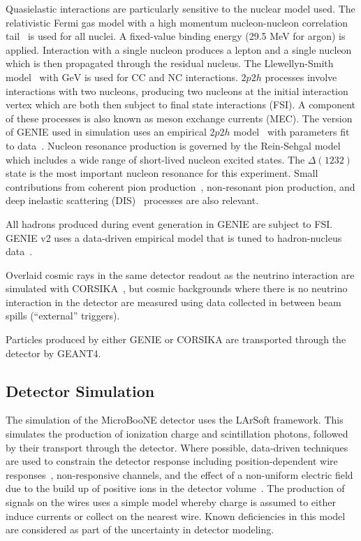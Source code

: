 \documentclass[%
twocolumn,
 amsmath,amssymb,
 aps,
prd,
superscriptaddress,showpacs]{revtex4-2}
\begin{document}
Quasielastic interactions are particularly sensitive to the nuclear model used.  The relativistic Fermi gas model with a high momentum nucleon-nucleon correlation tail~\cite{Bodek:1980ar} is used for all nuclei.
A fixed-value binding energy (29.5 MeV for argon) is applied.
Interaction with a single nucleon produces a lepton and a single nucleon which is then propagated through the residual nucleus.
The Llewellyn-Smith model~\cite{LlewellynSmith:1971zm} with  $\mathrm{GeV}$ is used for CC and NC interactions.
$2p2h$ processes involve interactions with two nucleons, producing two nucleons at the initial interaction vertex which are both then subject to final state interactions (FSI).
A component of these processes is also known as meson exchange currents (MEC).
The version of GENIE used in simulation uses an empirical $2p2h$ model~\cite{Katori:2013eoa} with parameters fit to \mb data~\cite{miniboone-ccqe}.  Nucleon resonance production is governed by the Rein-Sehgal model~\cite{Rein:1980wg} which includes a wide range of short-lived nucleon excited states.  The $\Delta(1232)$ state is the most important nucleon resonance for this experiment.
Small contributions from coherent pion production~\cite{Rein:2007}, non-resonant pion production, and deep inelastic scattering (DIS)~\cite{Bodek:2002ps} processes are also relevant.

All hadrons produced during event generation in GENIE are subject to FSI.  GENIE v2 uses a data-driven empirical model that is tuned to hadron-nucleus data~\cite{Dytman:2011zz}.  

Overlaid cosmic rays in the same detector readout as the neutrino interaction are simulated with CORSIKA~\cite{1998cmcc}, but cosmic backgrounds where there is no neutrino interaction in the detector are measured using data collected in between beam spills (``external'' triggers).

Particles produced by either GENIE or CORSIKA are transported through the detector by GEANT4.

\subsection{Detector Simulation}
\label{sec:detsim}

The simulation of the MicroBooNE detector uses the LArSoft framework.
This simulates the production of ionization charge and scintillation photons, followed by their transport through the detector.
Where possible, data-driven techniques are used to constrain the detector response including position-dependent wire responses~\cite{Adams:2018gbiPROCESS}, non-responsive channels\cite{Acciarri:2017sdeNOISE}, and the effect of a non-uniform electric field due to the build up of positive ions in the detector volume~\cite{uBUVLaser2019, uBcosmicSCE_2020}.
The production of signals on the wires uses a simple model whereby charge is assumed to either induce currents or collect on the nearest wire.  Known deficiencies in this model are considered as part of the uncertainty in detector modeling.
\end{document}
